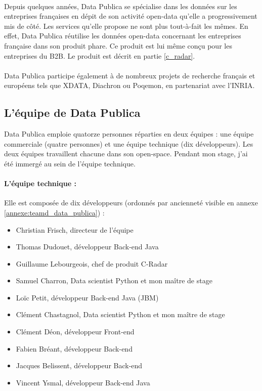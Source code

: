         \paragraph{}
            Depuis quelques années, Data Publica se spécialise dans les données sur les entreprises françaises en dépit de son activité open-data qu'elle a progressivement mis de côté. Les services qu'elle propose ne sont plus tout-à-fait les mêmes. En effet, Data Publica réutilise les données open-data concernant les entreprises française dans son produit phare. Ce produit est lui même conçu pour les entreprises du B2B. Le produit est décrit en partie \ref{c_radar}.

        \paragraph{}
            Data Publica participe également à de nombreux projets de recherche français et européens tels que XDATA, Diachron ou Poqemon, en partenariat avec l'INRIA.

    \subsection{L'équipe de Data Publica}
        Data Publica emploie quatorze personnes réparties en deux équipes : une équipe commerciale (quatre personnes) et une équipe technique (dix développeurs). Les deux équipes travaillent chacune dans son open-space. Pendant mon stage, j'ai été immergé au sein de l'équipe technique.

        \paragraph{L'équipe technique :}
            Elle est composée de dix développeurs (ordonnés par ancienneté visible en annexe \ref{annexe:teamd_data_publica}) :
            \begin{itemize}
                \item Christian Frisch, directeur de l'équipe
                \item Thomas Dudouet, développeur Back-end Java
                \item Guillaume Lebourgeois, chef de produit C-Radar
                \item Samuel Charron, Data scientist Python et mon maître de stage
                \item Loïc Petit, développeur Back-end Java (JBM)
                \item Clément Chastagnol, Data scientist Python et mon maître de stage
                \item Clément Déon, développeur Front-end
                \item Fabien Bréant, développeur Back-end
                \item Jacques Belissent, développeur Back-end
                \item Vincent Ysmal, développeur Back-end Java
            \end{itemize}


